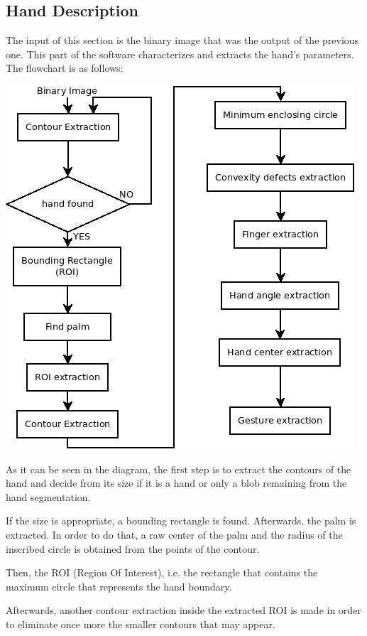 \documentclass{article}
\begin{document}
 
\subsection{Hand Description}

The input of this section is the binary image that was the output of the previous one. This part of the software characterizes and extracts the hand's parameters. 
The flowchart is as follows: 

\begin{center}
\includegraphics[scale=0.5]{../hand_description.jpeg} 
\end{center}

As it can be seen in the diagram, the first step is to extract the contours of the hand and decide from its size if it is a hand or only a blob remaining from the hand segmentation. 

If the size is appropriate, a bounding rectangle is found. Afterwards, the palm is extracted. In order to do that, a raw center of the palm and the radius of the inscribed circle is obtained from the points of the contour.

Then, the ROI (Region Of Interest), i.e. the rectangle that contains the maximum circle that represents the hand boundary.  

Afterwards, another contour extraction inside the extracted ROI is made in order to eliminate once more the smaller contours that may appear. 
\end{document}
